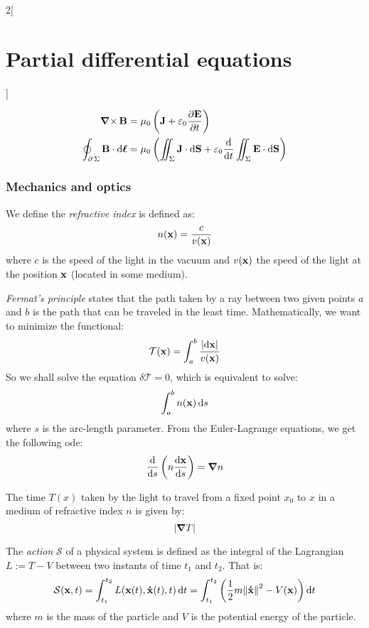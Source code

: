 \documentclass[../../../main.tex]{subfiles}
\begin{document}
\begin{multicols}{2}[\section{Partial differential equations}]
\begin{proposition}
    \begin{align*}
      \operatorname{\boldsymbol{\mathrm{\nabla}}\times}\boldsymbol{\mathrm{B}}                                   & =\mu_0\left(\boldsymbol{\mathrm{J}}+\varepsilon_0\pdv{\boldsymbol{\mathrm{E}}}{t}\right)                                                          \\
      \oint_{\operatorname{\partial}{\Sigma}}\boldsymbol{\mathrm{B}}\cdot \dd{\boldsymbol{\mathrm{\ell}}} & =\mu_0 \left(\iint_\Sigma\boldsymbol{\mathrm{J}}\cdot\dd{\boldsymbol{\mathrm{S}}}+\varepsilon_0\dv{}{t}\iint_\Sigma\boldsymbol{\mathrm{E}}\cdot \dd{\boldsymbol{\mathrm{S}}}\right)
    \end{align*}
  \end{proposition}
  \subsubsection{Mechanics and optics}
  \begin{definition}
    We define the \emph{refractive index} is defined as: $$n(\boldsymbol{\mathrm{x}})=\frac{c}{v(\boldsymbol{\mathrm{x}})}$$ where $c$ is the speed of the light in the vacuum and $v(\boldsymbol{\mathrm{x}})$ the speed of the light at the position $\boldsymbol{\mathrm{x}}$ (located in some medium).
  \end{definition}
  \begin{proposition}
    \emph{Fermat's principle} states that the path taken by a ray between two given points $a$ and $b$ is the path that can be traveled in the least time. Mathematically, we want to minimize the functional: $$\mathcal{T}(\boldsymbol{\mathrm{x}})=\int_a^b\frac{\abs{\dd{\boldsymbol{\mathrm{x}}}}}{v(\boldsymbol{\mathrm{x}})}$$
    So we shall solve the equation $\delta \mathcal{T}=0$, which is equivalent to solve: $$\int_a^bn(\boldsymbol{\mathrm{x}})\dd{s}$$ where $s$ is the arc-length parameter. From the Euler-Lagrange equations, we get the following ode: $$\dv{}{s}\left(n\dv{\boldsymbol{\mathrm{x}}}{s}\right)=\grad{n}$$
  \end{proposition}
  \begin{proposition}
    The time $T(x)$ taken by the light to travel from a fixed point $x_0$ to $x$ in a medium of refractive index $n$ is given by: $$\abs{\grad{T}}$$
  \end{proposition}
  \begin{definition}
    The \emph{action} $\mathcal{S}$ of a physical system is defined as the integral of the Lagrangian $L:=T-V$ between two instants of time $t_1$ and $t_2$. That is: $$\mathcal{S}(\boldsymbol{\mathrm{x}},t)=\int_{t_1}^{t_2}L(\boldsymbol{\mathrm{x}}(t),\boldsymbol{\mathrm{\dot{x}}}(t),t)\dd{t}=\int_{t_1}^{t_2}\left(\frac{1}{2}m{\|\boldsymbol{\mathrm{\dot{x}}}\|}^2-V(\boldsymbol{\mathrm{x}})\right)\dd{t}$$
    where $m$ is the mass of the particle and $V$ is the potential energy of the particle.
  \end{definition}

\end{multicols}
\end{document}
